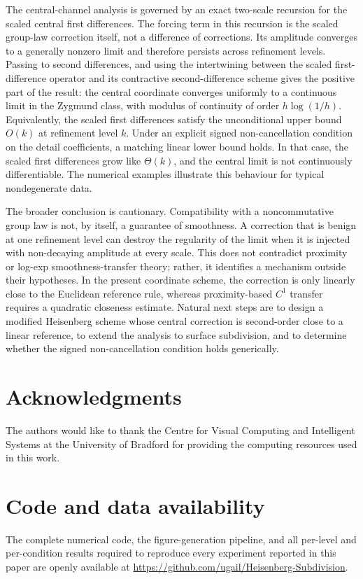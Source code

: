\documentclass{article}
\theoremstyle{plain}
\theoremstyle{definition}
\begin{document}
The central-channel analysis is governed by an exact two-scale recursion for
the scaled central first differences. The forcing term in this recursion is the
scaled group-law correction itself, not a difference of corrections. Its
amplitude converges to a generally nonzero limit and therefore persists across
refinement levels. Passing to second differences, and using the intertwining
between the scaled first-difference operator and its contractive
second-difference scheme gives the positive part of the result: the central
coordinate converges uniformly to a continuous limit in the Zygmund class, with
modulus of continuity of order $h\log(1/h)$. Equivalently, the scaled first
differences satisfy the unconditional upper bound $O(k)$ at refinement level
$k$. Under an explicit signed non-cancellation condition on the detail
coefficients, a matching linear lower bound holds. In that case, the scaled
first differences grow like $\Theta(k)$, and the central limit is not
continuously differentiable. The numerical examples illustrate this behaviour
for typical nondegenerate data.

The broader conclusion is cautionary. Compatibility with a noncommutative group
law is not, by itself, a guarantee of smoothness. A correction that is benign at
one refinement level can destroy the regularity of the limit when it is injected
with non-decaying amplitude at every scale. This does not contradict proximity or
log-exp smoothness-transfer theory; rather, it identifies a mechanism outside
their hypotheses. In the present coordinate scheme, the correction is only
linearly close to the Euclidean reference rule, whereas proximity-based
$C^1$ transfer requires a quadratic closeness estimate. Natural next steps are
to design a modified Heisenberg scheme whose central correction is
second-order close to a linear reference, to extend the analysis to surface
subdivision, and to determine whether the signed non-cancellation condition
holds generically.

\section*{Acknowledgments}
The authors would like to thank the Centre for Visual Computing and Intelligent
Systems at the University of Bradford for providing the computing resources used
in this work.

\section*{Code and data availability}
The complete numerical code, the figure-generation pipeline, and all per-level
and per-condition results required to reproduce every experiment reported in this
paper are openly available at \url{https://github.com/ugail/Heisenberg-Subdivision}.
\end{document}
